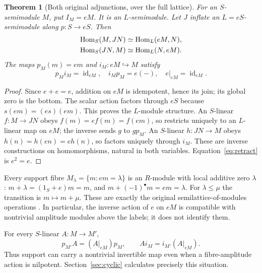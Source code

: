\documentclass[11pt,a4paper]{article}
\newtheorem{theorem}{Theorem}[section]\newtheorem{proposition}[theorem]{Proposition}\newtheorem{lemma}[theorem]{Lemma}\newtheorem{corollary}[theorem]{Corollary}
\theoremstyle{definition}\newtheorem{definition}[theorem]{Definition}\newtheorem{remark}[theorem]{Remark}
\begin{document}
\begin{theorem}[Both original adjunctions, over the full lattice]
For an $S$-semimodule $M$, put $I_M=eM$. It is an $L$-semimodule. Let $J$ inflate an $L=eS$-semimodule along $p:S\to eS$. Then
\begin{align}
 \operatorname{Hom}_S(M,JN)&\simeq\operatorname{Hom}_L(eM,N),                         \label{eq:adjleft}\\
 \operatorname{Hom}_S(JN,M)&\simeq\operatorname{Hom}_L(N,eM).                         \label{eq:adjright}
\end{align}
The maps $p_M(m)=em$ and $i_M:eM\hookrightarrow M$ satisfy
\begin{equation}
 p_Mi_M=\operatorname{id}_{eM},\quad i_Mp_M=e(-),\quad
 e|_{eM}=\operatorname{id}_{eM}.                           \label{eq:retract}
\end{equation}
\end{theorem}
\begin{proof}
Since $e+e=e$, addition on $eM$ is idempotent, hence its join; its global zero is the bottom. The scalar action factors through $eS$ because $s(em)=(es)(em)$. This proves the $L$-module structure. An $S$-linear $f:M\to JN$ obeys $f(m)=ef(m)=f(em)$, so restricts uniquely to an $L$-linear map on $eM$; the inverse sends $g$ to $gp_M$. An $S$-linear $h:JN\to M$ obeys $h(n)=h(en)=eh(n)$, so factors uniquely through $i_M$. These are inverse constructions on homomorphisms, natural in both variables. Equation~\eqref{eq:retract} is $e^2=e$.
\end{proof}
Every support fibre $M_\lambda=\{m:em=\lambda\}$ is an $R$-module with local additive zero $\lambda$: $m+\lambda=(1_S+e)m=m$, and $m+(-1)^\bullet m=em=\lambda$. For $\lambda\le\mu$ the transition is $m\mapsto m+\mu$. These are exactly the original semilattice-of-modules operations \cite[semimodule section]{Secondary}. In particular, the inverse action of $e$ on $eM$ is compatible with nontrivial amplitude modules above the labels; it does not identify them.

For every $S$-linear $A:M\to M'$,
\begin{equation}
 p_{M'}A=(A|_{eM})p_M,\qquad Ai_M=i_{M'}(A|_{eM}).        \label{eq:naturality}
\end{equation}
Thus support can carry a nontrivial invertible map even when a fibre-amplitude action is nilpotent. Section~\ref{sec:cyclic} calculates precisely this situation.
\end{document}
